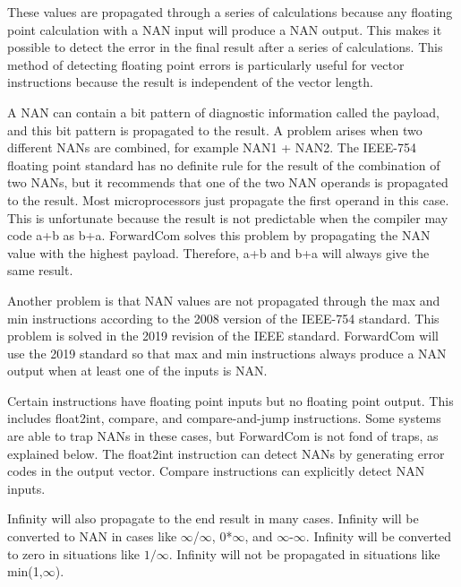 \documentclass[forwardcom.tex]{subfiles}
\begin{document}
These values are propagated through a series of calculations because any floating point calculation with a NAN input will produce a NAN output. This makes it possible to detect the error in the final result after a series of calculations. This method of detecting floating point errors is particularly useful for vector instructions because the result is independent of the vector length.
\vspace{2mm}

A NAN can contain a bit pattern of diagnostic information called the payload, and this bit pattern is propagated to the result. A problem arises when two different NANs are combined, for example NAN1 + NAN2. The IEEE-754 floating point standard  has no definite rule for the result of the combination of two NANs, but it recommends that one of the two NAN operands is propagated to the result. Most microprocessors just propagate the first operand in this case. This is unfortunate because the result is not predictable when the compiler may code a+b as b+a. ForwardCom solves this problem by propagating the NAN value with the highest payload. Therefore, a+b and b+a will always give the same result.
\vspace{2mm}

Another problem is that NAN values are not propagated through the max and min instructions according to the 2008 version of the IEEE-754 standard. 
This problem is solved in the 2019 revision of the IEEE standard. ForwardCom will use the 2019 standard so that max and min instructions always produce a NAN output when at least one of the inputs is NAN.
\vspace{2mm}

Certain instructions have floating point inputs but no floating point output. 
This includes float2int, compare, and compare-and-jump instructions. 
Some systems are able to trap NANs in these cases, but ForwardCom is not fond of traps, as explained below. The float2int instruction can detect NANs by generating error codes in the output vector. Compare instructions can explicitly detect NAN inputs.
\vspace{2mm}

Infinity will also propagate to the end result in many cases. 
Infinity will be converted to NAN in cases like $\infty$/$\infty$, 0*$\infty$, and $\infty$-$\infty$.
Infinity will be converted to zero in situations like $1/\infty$. Infinity will not be propagated in situations like min(1,$\infty$).
\vspace{2mm}
\end{document}
